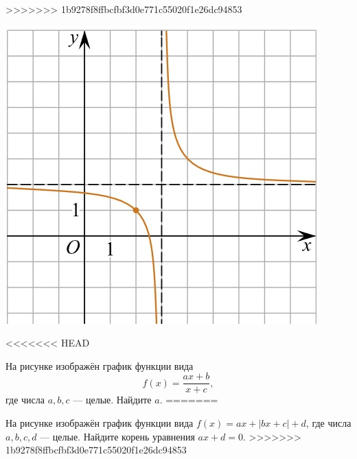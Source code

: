 \begin{class}[number=5]
\begin{listofex}
\begin{minipage}[t]{\bodywidth}
\begin{minipage}[t]{\bodywidth}
\begin{minipage}[t]{\bodywidth}
\begin{minipage}[t]{\bodywidth}
\begin{minipage}[t]{0.43\textwidth}
\begin{minipage}[t]{\bodywidth}
\begin{minipage}[t]{0.43\textwidth}
\begin{minipage}[t]{\bodywidth}
\begin{minipage}[t]{0.43\textwidth}
\begin{minipage}[t]{\bodywidth}
\begin{minipage}[t]{0.43\textwidth}
\begin{minipage}[t]{\bodywidth}
\begin{minipage}[t]{0.43\textwidth}
>>>>>>> 1b9278f8ffbcfbf3d0e771c55020f1e26dc94853
		\end{minipage}
		\hspace{0.05\linewidth}
		\begin{minipage}[t]{\picwidth}
			\includegraphics[align=t, width=\linewidth]{../pics/G101M4C5-4.jpg}
		\end{minipage}
		\item
<<<<<<< HEAD
		\begin{minipage}[t]{\bodywidth}
			На рисунке изображён график функции вида \[ f(x)=\dfrac{ax+b}{x+c}, \] где числа \(a, b, c\) --- целые. Найдите \(a\).
=======
		\begin{minipage}[t]{0.43\textwidth}
			На рисунке изображён график функции вида \(f(x)=ax+|bx+c|+d\), где числа \(a, b, c, d\) --- целые. Найдите корень уравнения \(ax+d=0\).
>>>>>>> 1b9278f8ffbcfbf3d0e771c55020f1e26dc94853
		\end{minipage}
		\hspace{0.05\linewidth}
		\begin{minipage}[t]{\picwidth}

\end{minipage}
\end{minipage}
\end{minipage}
\end{minipage}
\end{minipage}
\end{minipage}
\end{minipage}
\end{minipage}
\end{minipage}
\end{minipage}
\end{minipage}
\end{minipage}
\end{minipage}
\end{minipage}
\end{listofex}
\end{class}
